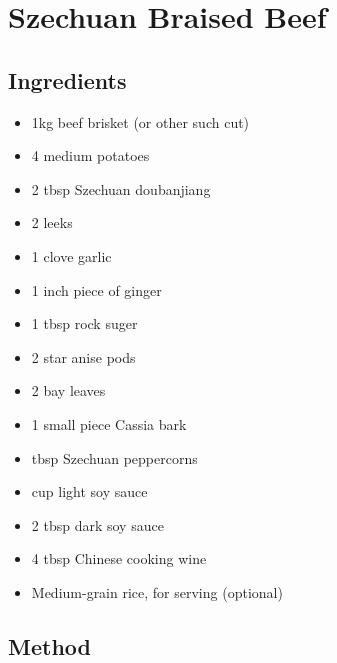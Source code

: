 \clearpage
\section{Szechuan Braised Beef}


\subsection{Ingredients}

\begin{itemize}
  \item 1kg beef brisket (or other such cut)
  \item 4 medium potatoes
  \item 2 tbsp Szechuan doubanjiang
  \item 2 leeks
  \item 1 clove garlic
  \item 1 inch piece of ginger
  \item 1 tbsp rock suger
  \item 2 star anise pods
  \item 2 bay leaves
  \item 1 small piece Cassia bark
  \item {} tbsp Szechuan peppercorns
  \item {} cup light soy sauce
  \item 2 tbsp dark soy sauce
  \item 4 tbsp Chinese cooking wine
  \item Medium-grain rice, for serving (optional)
\end{itemize}

\subsection{Method}

